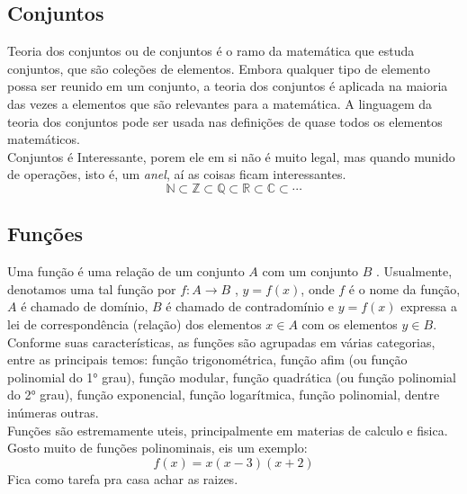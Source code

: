 \documentclass{article}
\begin{document}
    \subsection{Conjuntos}
    Teoria dos conjuntos ou de conjuntos é o ramo da matemática que estuda conjuntos, que são coleções de elementos. Embora qualquer tipo de elemento possa ser reunido em um conjunto, a teoria dos conjuntos é aplicada na maioria das vezes a elementos que são relevantes para a matemática. A linguagem da teoria dos conjuntos pode ser usada nas definições de quase todos os elementos matemáticos.\cite{conjuntos}
    \\Conjuntos é Interessante, porem ele em si não é muito legal, mas quando munido de operações, isto é, um \textit{anel}, aí as coisas ficam interessantes.
    \[
        \mathbb{N} \subset \mathbb{Z} \subset \mathbb{Q} \subset \mathbb{R} \subset \mathbb{C} \subset \cdots
    \]
    \subsection{Funções}
    Uma função é uma relação de um conjunto $A$ com um conjunto $B$ . Usualmente, denotamos uma tal função por $f : A \rightarrow B$ ,  $y = f ( x )$, onde $f$ é o nome da função, $A$ é chamado de domínio, $B$ é chamado de contradomínio e $y = f (x)$ expressa a lei de correspondência (relação) dos elementos $x \in A$ com os elementos $y \in B$. Conforme suas características, as funções são agrupadas em várias categorias, entre as principais temos: função trigonométrica, função afim (ou função polinomial do 1° grau), função modular, função quadrática (ou função polinomial do 2° grau), função exponencial, função logarítmica, função polinomial, dentre inúmeras outras.\cite{funcoes}
    \\Funções são estremamente uteis, principalmente em materias de calculo e fisica. Gosto muito de funções polinominais, eis um exemplo:
    \[
        f(x)=x(x-3)(x+2)
    \]
    Fica como tarefa pra casa achar as raizes.
\end{document}
